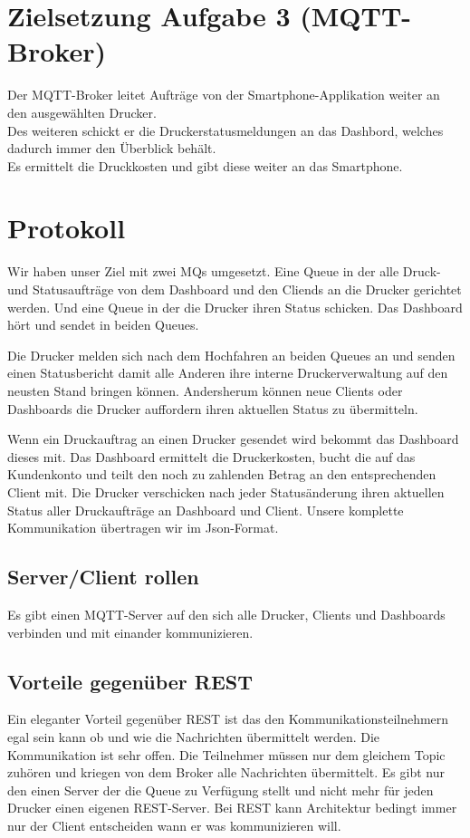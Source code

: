 \documentclass[10pt]{article}
\begin{document}
\section{Zielsetzung Aufgabe 3 (MQTT-Broker)}
Der MQTT-Broker leitet Aufträge von der Smartphone-Applikation weiter an den ausgewählten Drucker. \\
Des weiteren schickt er die Druckerstatusmeldungen an das Dashbord, welches dadurch immer den Überblick behält.\\
Es ermittelt die Druckkosten und gibt diese weiter an das Smartphone.\\

\section{Protokoll}
Wir haben unser Ziel mit zwei MQs umgesetzt. Eine Queue in der alle Druck- und Statusaufträge von dem Dashboard und den Cliends an die Drucker gerichtet werden. Und eine Queue in der die Drucker ihren Status schicken. Das Dashboard hört und sendet in beiden Queues. 

Die Drucker melden sich nach dem Hochfahren an beiden Queues an und senden einen Statusbericht damit alle Anderen ihre interne Druckerverwaltung auf den neusten Stand bringen können. Andersherum können neue Clients oder Dashboards die Drucker auffordern ihren aktuellen Status zu übermitteln.

Wenn ein Druckauftrag an einen Drucker gesendet wird bekommt das Dashboard dieses mit. Das Dashboard ermittelt die Druckerkosten, bucht die auf das Kundenkonto und teilt den noch zu zahlenden Betrag an den entsprechenden Client mit.
Die Drucker verschicken nach jeder Statusänderung ihren aktuellen Status aller Druckaufträge an Dashboard und Client.
Unsere komplette Kommunikation übertragen wir im Json-Format. 

\subsection{Server/Client rollen}
Es gibt einen MQTT-Server auf den sich alle Drucker, Clients und Dashboards verbinden und mit einander kommunizieren.

\subsection{Vorteile gegenüber REST}
Ein eleganter Vorteil gegenüber REST ist das den Kommunikationsteilnehmern egal sein kann ob und wie die Nachrichten übermittelt werden. Die Kommunikation ist sehr offen. Die Teilnehmer müssen nur dem gleichem Topic zuhören und kriegen von dem Broker alle Nachrichten übermittelt. 
Es gibt nur den einen Server der die Queue zu Verfügung stellt und nicht mehr für jeden Drucker einen eigenen REST-Server.
Bei REST kann Architektur bedingt immer nur der Client entscheiden wann er was kommunizieren will.
\end{document}

